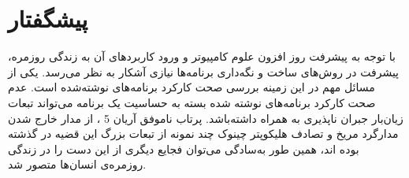 \documentclass[12pt]{report}
\begin{document}
%




\chapter*{پیشگفتار }
با توجه به پیشرفت روز‌ افزون علوم کامپیوتر و ورود کاربرد‌های آن به زندگی روزمره، پیشرفت در روش‌های ساخت و نگه‌داری برنامه‌ها نیازی آشکار به نظر می‌رسد. یکی از مسائل مهم در این زمینه بررسی صحت کارکرد برنامه‌های نوشته‌شده است. عدم صحت کارکرد برنامه‌های نوشته‌ شده بسته به حساسیت یک برنامه می‌تواند تبعات زیان‌بار جبران ناپذیری به همراه داشته‌باشد. پرتاب ناموفق آریان 5\cite{ariane}  ، از مدار خارج شدن مدار‌گرد مریخ \cite{orbiter} و  تصادف هلیکوپتر چینوک \cite{chinook} چند نمونه از تبعات بزرگ این قضیه در گذشته بوده اند، همین‌ طور به‌سادگی می‌توان فجایع دیگری از این دست را در زندگی روزمره‌ی انسان‌ها متصور شد.
\end{document}
